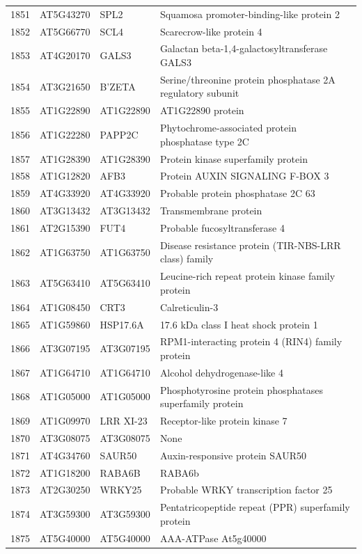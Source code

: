 \documentclass[11pt]{article}
\begin{document}
\begin{center}
\begin{tabular}{rlll}
1851 & AT5G43270 & SPL2 & Squamosa promoter-binding-like protein 2\\
1852 & AT5G66770 & SCL4 & Scarecrow-like protein 4\\
1853 & AT4G20170 & GALS3 & Galactan beta-1,4-galactosyltransferase GALS3\\
1854 & AT3G21650 & B'ZETA & Serine/threonine protein phosphatase 2A regulatory subunit\\
1855 & AT1G22890 & AT1G22890 & AT1G22890 protein\\
1856 & AT1G22280 & PAPP2C & Phytochrome-associated protein phosphatase type 2C\\
1857 & AT1G28390 & AT1G28390 & Protein kinase superfamily protein\\
1858 & AT1G12820 & AFB3 & Protein AUXIN SIGNALING F-BOX 3\\
1859 & AT4G33920 & AT4G33920 & Probable protein phosphatase 2C 63\\
1860 & AT3G13432 & AT3G13432 & Transmembrane protein\\
1861 & AT2G15390 & FUT4 & Probable fucosyltransferase 4\\
1862 & AT1G63750 & AT1G63750 & Disease resistance protein (TIR-NBS-LRR class) family\\
1863 & AT5G63410 & AT5G63410 & Leucine-rich repeat protein kinase family protein\\
1864 & AT1G08450 & CRT3 & Calreticulin-3\\
1865 & AT1G59860 & HSP17.6A & 17.6 kDa class I heat shock protein 1\\
1866 & AT3G07195 & AT3G07195 & RPM1-interacting protein 4 (RIN4) family protein\\
1867 & AT1G64710 & AT1G64710 & Alcohol dehydrogenase-like 4\\
1868 & AT1G05000 & AT1G05000 & Phosphotyrosine protein phosphatases superfamily protein\\
1869 & AT1G09970 & LRR XI-23 & Receptor-like protein kinase 7\\
1870 & AT3G08075 & AT3G08075 & None\\
1871 & AT4G34760 & SAUR50 & Auxin-responsive protein SAUR50\\
1872 & AT1G18200 & RABA6B & RABA6b\\
1873 & AT2G30250 & WRKY25 & Probable WRKY transcription factor 25\\
1874 & AT3G59300 & AT3G59300 & Pentatricopeptide repeat (PPR) superfamily protein\\
1875 & AT5G40000 & AT5G40000 & AAA-ATPase At5g40000\\

\end{tabular}
\end{center}
\end{document}
